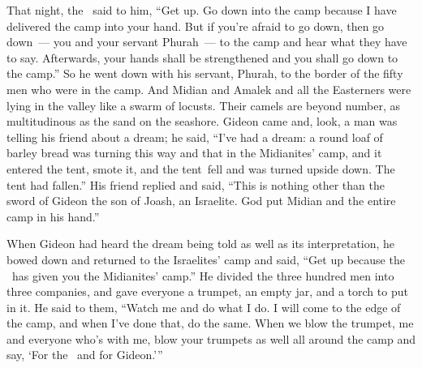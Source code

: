 \begin{inparaenum}
   That night, the \lord\ said to him, ``Get up. Go down into the camp because I have delivered the camp into your hand.%
   But if you're afraid to go down, then go down~--- you and your servant Phurah~--- to the camp%
   and hear what they have to say. Afterwards, your hands shall be strengthened and you shall go down to the camp.'' So he went down with his servant, Phurah, to the border of the fifty men who were in the camp.%
   And Midian and Amalek and all the Easterners were lying in the valley like a swarm of locusts. Their camels are beyond number, as multitudinous as the sand on the seashore.%
   Gideon came and, look, a man was telling his friend about a dream; he said, ``I've had a dream: a round loaf of barley bread was turning this way and that in the Midianites' camp, and it entered the tent, smote it, and the tent\understood{}\ fell and was turned upside down. The tent had fallen.''%
   His friend replied and said, ``This is nothing other than the sword of Gideon the son of Joash, an Israelite. God put Midian and the entire camp in his hand.''%

   When Gideon had heard the dream being told as well as its interpretation, he bowed down and returned to the Israelites' camp and said, ``Get up because the \lord\ has given you the Midianites' camp.''%
   He divided the three hundred men into three companies, and gave everyone a trumpet, an empty jar, and a torch to put in it.%
   He said to them, ``Watch me and do what I do. I will come to the edge of the camp, and when I've done that, do the same.%
   When we blow the trumpet, me and everyone who's with me, blow your trumpets as well all around the camp and say, `For the \lord\ and for Gideon.'\thinspace''%


\end{inparaenum}
